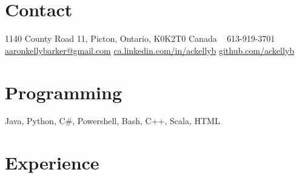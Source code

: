 \documentclass[]{friggeri-cv} %
\begin{document}



\begin{aside} %
\section{Contact}
1140 County Road 11, 
Picton, Ontario,
K0K2T0 Canada
~
613-919-3701
~
\href{mailto:aaron.kelly.barker@gmail.com}{aaronkellybarker@gmail.com}
\href{ca.linkedin.com/in/ackellyb/}{ca.linkedin.com/in/ackellyb}
\href{https://github.com/ackellyb}{github.com/ackellyb}
\section{Programming}
Java, Python, C\#,
Powershell, Bash, 
C++, Scala, HTML
\end{aside}


\section{Experience}
\end{document}
